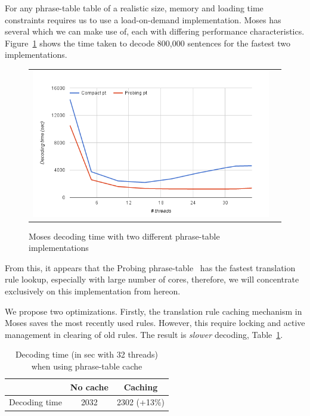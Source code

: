 \documentclass[11pt]{article}
\begin{document}
For any phrase-table table of a realistic size, memory and loading time constraints requires us to use a load-on-demand implementation. Moses has several which we can make use of, each with differing performance characteristics. Figure~\ref{fig:moses-phrase-tables-time} shows the time taken to decode 800,000 sentences for the fastest two implementations.
\begin{figure}[h]
\centering
\begin{tabular}{cc}
{\includegraphics[scale=0.4]{moses-phrase-table.png}} 
\end{tabular}
\caption{Moses decoding time with two different phrase-table implementations}
\label{fig:moses-phrase-tables-time}
\end{figure} 
From this, it appears that the Probing phrase-table~\cite{Bogoychev:Thesis:2013} has the fastest translation rule lookup, especially with large number of cores, therefore, we will concentrate exclusively on this implementation from hereon.

We propose two optimizations. Firstly, the translation rule caching mechanism in Moses saves the most recently used rules. However, this require locking and active management in clearing of old rules. The result is \emph{slower} decoding, Table~\ref{tab:phrase-table-cache}. 
\begin{table}[h]
\small
\begin{center}
\begin{tabular}{|l|c|c|} \hline
		& No cache	& Caching \\ \hline
Decoding time  	& 2032 		& 2302 (+13\%) \\ \hline
\end{tabular}
\end{center}
\caption{Decoding time (in sec with 32 threads) when using phrase-table cache}
\label{tab:phrase-table-cache}
\end{table}
\end{document}
